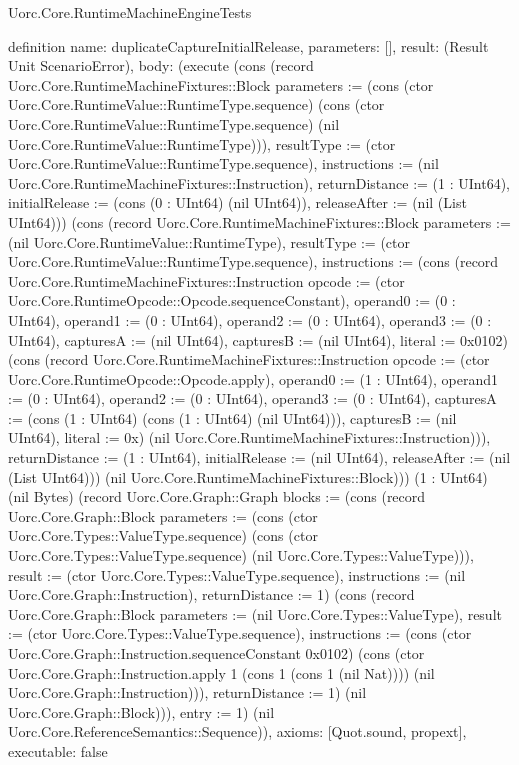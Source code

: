 \begin{lexlean}{Uorc.Core.RuntimeMachineEngineTests}
\begin{semanticmodule}
definition{
  name: duplicateCaptureInitialRelease,
  parameters: [],
  result: (Result Unit ScenarioError),
  body: (execute (cons (record Uorc.Core.RuntimeMachineFixtures::Block {parameters := (cons (ctor Uorc.Core.RuntimeValue::RuntimeType.sequence) (cons (ctor Uorc.Core.RuntimeValue::RuntimeType.sequence) (nil Uorc.Core.RuntimeValue::RuntimeType))), resultType := (ctor Uorc.Core.RuntimeValue::RuntimeType.sequence), instructions := (nil Uorc.Core.RuntimeMachineFixtures::Instruction), returnDistance := (1 : UInt64), initialRelease := (cons (0 : UInt64) (nil UInt64)), releaseAfter := (nil (List UInt64))}) (cons (record Uorc.Core.RuntimeMachineFixtures::Block {parameters := (nil Uorc.Core.RuntimeValue::RuntimeType), resultType := (ctor Uorc.Core.RuntimeValue::RuntimeType.sequence), instructions := (cons (record Uorc.Core.RuntimeMachineFixtures::Instruction {opcode := (ctor Uorc.Core.RuntimeOpcode::Opcode.sequenceConstant), operand0 := (0 : UInt64), operand1 := (0 : UInt64), operand2 := (0 : UInt64), operand3 := (0 : UInt64), capturesA := (nil UInt64), capturesB := (nil UInt64), literal := 0x0102}) (cons (record Uorc.Core.RuntimeMachineFixtures::Instruction {opcode := (ctor Uorc.Core.RuntimeOpcode::Opcode.apply), operand0 := (1 : UInt64), operand1 := (0 : UInt64), operand2 := (0 : UInt64), operand3 := (0 : UInt64), capturesA := (cons (1 : UInt64) (cons (1 : UInt64) (nil UInt64))), capturesB := (nil UInt64), literal := 0x}) (nil Uorc.Core.RuntimeMachineFixtures::Instruction))), returnDistance := (1 : UInt64), initialRelease := (nil UInt64), releaseAfter := (nil (List UInt64))}) (nil Uorc.Core.RuntimeMachineFixtures::Block))) (1 : UInt64) (nil Bytes) (record Uorc.Core.Graph::Graph {blocks := (cons (record Uorc.Core.Graph::Block {parameters := (cons (ctor Uorc.Core.Types::ValueType.sequence) (cons (ctor Uorc.Core.Types::ValueType.sequence) (nil Uorc.Core.Types::ValueType))), result := (ctor Uorc.Core.Types::ValueType.sequence), instructions := (nil Uorc.Core.Graph::Instruction), returnDistance := 1}) (cons (record Uorc.Core.Graph::Block {parameters := (nil Uorc.Core.Types::ValueType), result := (ctor Uorc.Core.Types::ValueType.sequence), instructions := (cons (ctor Uorc.Core.Graph::Instruction.sequenceConstant 0x0102) (cons (ctor Uorc.Core.Graph::Instruction.apply 1 (cons 1 (cons 1 (nil Nat)))) (nil Uorc.Core.Graph::Instruction))), returnDistance := 1}) (nil Uorc.Core.Graph::Block))), entry := 1}) (nil Uorc.Core.ReferenceSemantics::Sequence)),
  axioms: [Quot.sound, propext],
  executable: false
}


\end{semanticmodule}
\end{lexlean}
